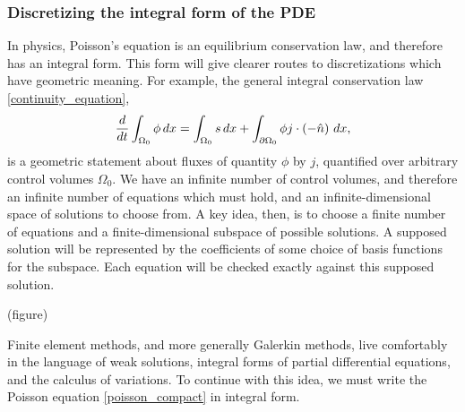 
\subsubsection{Discretizing the integral form of the PDE}
In physics, Poisson's equation is an equilibrium conservation law, and therefore has an integral form.
This form will give clearer routes to discretizations which
have geometric meaning.
For example, the general integral conservation law \eqref{continuity_equation},
\begin{align*}
    \frac{d}{dt} \int_{\Omega_0} \phi\,dx = \int_{\Omega_0} s\,dx + \int_{{\partial\Omega_0}} \phi j \cdot \left(-\hat{n}\right)\,dx,
\end{align*}
is a geometric statement about fluxes
of quantity $\phi$ by $j$, quantified over arbitrary control volumes $\Omega_0$.
We have an infinite number of control volumes, and therefore an infinite number of equations which must hold, and an infinite-dimensional
space of solutions to choose from. A key idea, then, is to choose a finite number of equations and a finite-dimensional subspace of possible solutions.
A supposed solution will be represented by the coefficients of some choice of basis functions for the subspace. Each equation will be checked exactly against this supposed solution.

\vskip 0.2in
(figure)
\vskip 0.2in

Finite element methods, and more generally Galerkin methods, live comfortably in the language of weak solutions, integral forms of partial differential equations,
and the calculus of variations.
To continue with this idea, we must write the Poisson equation \eqref{poisson_compact} in integral form.

